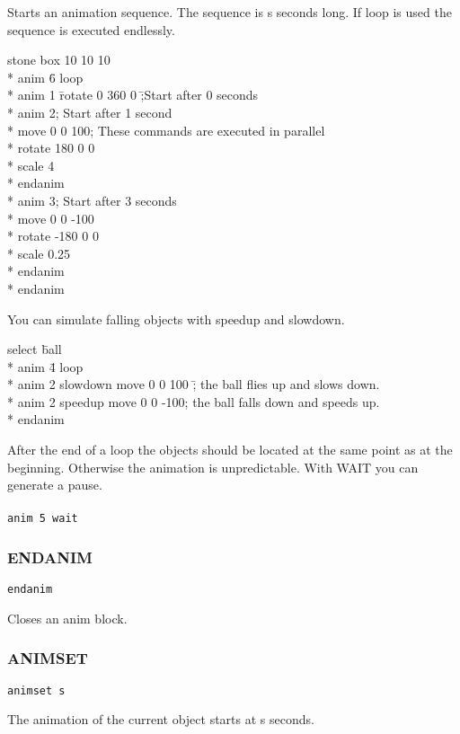 Starts an animation sequence. The sequence is s seconds long. If loop is used
the sequence is executed endlessly.\\
\tt{
\begin{tabbing}
stone box 10 10 10\\*
anim \=6 loop\\*
\>anim 1 \= rotate 0 360 0 \=;Start after 0 seconds\\*
\>anim 2\>\>; Start after 1 second\\*
\>\>move 0 0 100\>; These commands are executed in parallel\\*
\>\>rotate 180 0 0\\*
\>\>scale 4\\*
\>endanim\\*
\>anim 3\>\>; Start after 3 seconds\\*
\>\>move 0 0 -100\\*
\>\>rotate -180 0 0\\*
\>\>scale 0.25\\*
\>endanim\\*
endanim
\end{tabbing}
}
You can simulate falling objects with speedup and slowdown.
\tt{
\begin{tabbing}
select \=ball\\*
\>anim \=4 loop\\*
\>\>anim 2 slowdown move 0 0 100 \=; the ball flies up and slows down.\\*
\>\>anim 2 speedup move 0 0 -100\>; the ball falls down and speeds up.\\*
\>endanim
\end{tabbing}
}

After the end of a loop the objects should be located at the same point
as at the beginning. Otherwise the animation is unpredictable. With WAIT
you can generate a pause.\\
\tt{
\\
anim 5 wait
}

\subsubsection{ENDANIM}
\tt{endanim}

Closes an anim block.

\subsubsection{ANIMSET}
\tt{animset s}

The animation of the current object starts at s seconds.

